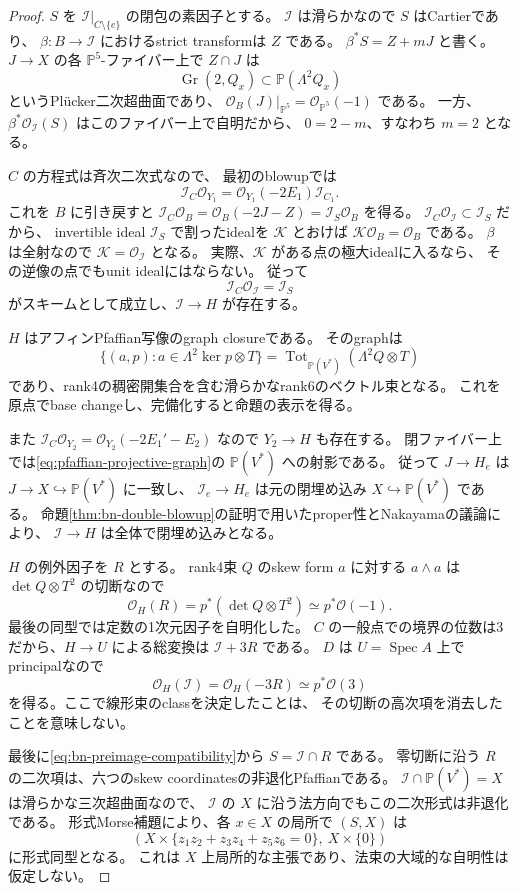 \documentclass[a4paper,11pt]{ltjsarticle}
\theoremstyle{definition}
\newcommand{\OO}{\mathcal O}
\newcommand{\PP}{\mathbb P}
\newcommand{\Gr}{\operatorname{Gr}}
\begin{document}
\begin{proof}
$S$ を $\mathcal I|_{C\setminus\{e\}}$ の閉包の素因子とする。
$\mathcal I$ は滑らかなので $S$ はCartierであり、
$\beta:B\to\mathcal I$ におけるstrict transformは $Z$ である。
$\beta^*S=Z+mJ$ と書く。
$J\to X$ の各 $\PP^5$-ファイバー上で $Z\cap J$ は
\[
 \Gr(2,Q_x)\subset\PP(\Lambda^2Q_x)
\]
というPl\"ucker二次超曲面であり、
$\OO_B(J)|_{\PP^5}=\OO_{\PP^5}(-1)$ である。
一方、$\beta^*\OO_{\mathcal I}(S)$ はこのファイバー上で自明だから、
$0=2-m$、すなわち $m=2$ となる。

$C$ の方程式は斉次二次式なので、
最初のblowupでは
\[
 \mathcal I_C\OO_{Y_1}
 =\OO_{Y_1}(-2E_1)\mathcal I_{C_1}.
\]
これを $B$ に引き戻すと
$\mathcal I_C\OO_B=\OO_B(-2J-Z)=\mathcal I_S\OO_B$ を得る。
$\mathcal I_C\OO_{\mathcal I}\subset\mathcal I_S$ だから、
invertible ideal $\mathcal I_S$ で割ったidealを $\mathcal K$ とおけば
$\mathcal K\OO_B=\OO_B$ である。
$\beta$ は全射なので $\mathcal K=\OO_{\mathcal I}$ となる。
実際、$\mathcal K$ がある点の極大idealに入るなら、
その逆像の点でもunit idealにはならない。
従って
\begin{equation}\label{eq:bn-preimage-compatibility}
 \mathcal I_C\OO_{\mathcal I}=\mathcal I_S
\end{equation}
がスキームとして成立し、$\mathcal I\to H$ が存在する。

$H$ はアフィンPfaffian写像のgraph closureである。
そのgraphは
\[
 \{(a,p):a\in\Lambda^2\ker p\otimes T\}
 =\operatorname{Tot}_{\PP(V^*)}(\Lambda^2Q\otimes T)
\]
であり、rank4の稠密開集合を含む滑らかなrank6のベクトル束となる。
これを原点でbase changeし、完備化すると命題の表示を得る。

また $\mathcal I_C\OO_{Y_2}=\OO_{Y_2}(-2E_1'-E_2)$ なので
$Y_2\to H$ も存在する。
閉ファイバー上では\eqref{eq:pfaffian-projective-graph}の $\PP(V^*)$ への射影である。
従って $J\to H_e$ は $J\to X\hookrightarrow\PP(V^*)$ に一致し、
$\mathcal I_e\to H_e$ は元の閉埋め込み $X\hookrightarrow\PP(V^*)$ である。
命題\ref{thm:bn-double-blowup}の証明で用いたproper性とNakayamaの議論により、
$\mathcal I\to H$ は全体で閉埋め込みとなる。

$H$ の例外因子を $R$ とする。
rank4束 $Q$ のskew form $a$ に対する $a\wedge a$ は
$\det Q\otimes T^2$ の切断なので
\[
 \OO_H(R)=p^*(\det Q\otimes T^2)\simeq p^*\OO(-1).
\]
最後の同型では定数の1次元因子を自明化した。
$C$ の一般点での境界の位数は3だから、$H\to U$ による総変換は
$\mathcal I+3R$ である。
$D$ は $U=\operatorname{Spec}A$ 上でprincipalなので
\[
 \OO_H(\mathcal I)=\OO_H(-3R)\simeq p^*\OO(3)
\]
を得る。ここで線形束のclassを決定したことは、
その切断の高次項を消去したことを意味しない。

最後に\eqref{eq:bn-preimage-compatibility}から $S=\mathcal I\cap R$ である。
零切断に沿う $R$ の二次項は、六つのskew coordinatesの非退化Pfaffianである。
$\mathcal I\cap\PP(V^*)=X$ は滑らかな三次超曲面なので、
$\mathcal I$ の $X$ に沿う法方向でもこの二次形式は非退化である。
形式Morse補題により、各 $x\in X$ の局所で $(S,X)$ は
\[
 \left(X\times
 \{z_1z_2+z_3z_4+z_5z_6=0\},\ X\times\{0\}\right)
\]
に形式同型となる。
これは $X$ 上局所的な主張であり、法束の大域的な自明性は仮定しない。
\end{proof}
\end{document}
